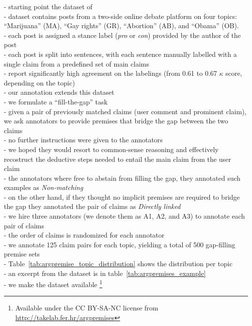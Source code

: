 - starting point the dataset of \citet{hasan2014you} \\
- dataset contains posts from a two-side online debate platform 
on four topics: ``Marijuana'' (MA), ``Gay rights'' (GR), 
``Abortion'' (AB), and ``Obama'' (OB). \\
- each post is assigned a stance label (\textit{pro} or \textit{con}) 
provided by the author of the post \\
- each post is split into sentences, with each sentence manually
labelled with a single claim from a predefined set of main 
claims \\
- \citet{hasan2014you} report significantly high agreement on the labelings
(from 0.61 to 0.67 $\kappa$ score, depending on the topic) \\
- our annotation extends this dataset \\
- we formulate a ``fill-the-gap'' task \\
- given a pair of previously matched claims (user comment and 
prominent claim), we ask annotators to provide premises that bridge the gap 
between the two claims \\
- no further instructions were given to the annotators \\
- we hoped they would resort to common-sense reasoning and effectively 
recostruct the deductive steps needed to entail the main claim from the user
claim \\
- the annotators where free to abstain from filling the gap, they
annotated such examples as \emph{Non-matching} \\
- on the other hand, if they thought no implicit premises are required
to bridge the gap they annotated the pair of claims as \emph{Directly linked} \\
- we hire three annotators (we denote them as A1, A2, and A3) to annotate each pair of claims \\
- the order of claims is randomized for each annotator \\
- we annotate 125 claim pairs for each topic, yielding a total of 500 gap-filling
premise sets \\
- Table~\ref{tab:argpremise_topic_distribution} shows the distribution per topic \\
- an excerpt from the dataset is in table~\ref{tab:argpremises_example} \\
- we make the dataset available 
\footnote{Available under the CC BY-SA-NC license from
\url{http://takelab.fer.hr/argpremises}} \\

